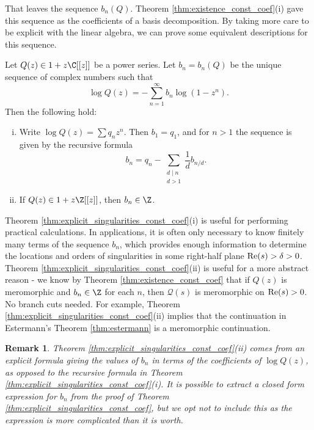 \documentclass[12pt]{amsart}
\newtheorem{remark}[theorem]{Remark}
\theoremstyle{plain}
\begin{document}
That leaves the sequence $b_n(Q)$. Theorem \ref{thm:existence_const_coef}(i) gave this sequence as the coefficients of a basis decomposition. By taking more care to be explicit with the linear algebra, we can prove some equivalent descriptions for this sequence.

\begin{theorem}\label{thm:explicit_singularities_const_coef}
    Let $Q(z)\in 1+z\C[[z]]$ be a power series. Let $b_n = b_n(Q)$ be the unique sequence of complex numbers such that
    \[
        \log Q(z) = -\sum_{n=1}^{\infty} b_n \log(1-z^n).
    \]
    Then the following hold:
    \begin{enumerate}[(i)]
        \item Write $\log Q(z)=\sum q_n z^n$. Then $b_1=q_1$, and for $n>1$ the sequence is given by the recursive formula
        \[
            b_n = q_n - \sum_{\substack{d\mid n\\d>1}}\frac{1}{d}b_{n/d}.
        \]
        \item If $Q(z) \in 1 + z\Z[[z]]$, then $b_n\in \Z$.
    \end{enumerate}
\end{theorem}

Theorem \ref{thm:explicit_singularities_const_coef}(i) is useful for performing practical calculations. In applications, it is often only necessary to know finitely many terms of the sequence $b_n$, which provides enough information to determine the locations and orders of singularities in some right-half plane ${\rm Re}(s) > \delta > 0$. Theorem \ref{thm:explicit_singularities_const_coef}(ii) is useful for a more abstract reason - we know by Theorem \ref{thm:existence_const_coef} that if $Q(z)$ is meromorphic and $b_n\in \Z$ for each $n$, then $\mathcal{Q}(s)$ is meromorphic on ${\rm Re}(s)>0$. No branch cuts needed. For example, Theorem \ref{thm:explicit_singularities_const_coef}(ii) implies that the continuation in Estermann's Theorem \ref{thm:estermann} is a meromorphic continuation.

\begin{remark}
    Theorem \ref{thm:explicit_singularities_const_coef}(ii) comes from an explicit formula giving the values of $b_n$ in terms of the coefficients of $\log Q(z)$, as opposed to the recursive formula in Theorem \ref{thm:explicit_singularities_const_coef}(i). It is possible to extract a closed form expression for $b_n$ from the proof of Theorem \ref{thm:explicit_singularities_const_coef}, but we opt not to include this as the expression is more complicated than it is worth.
\end{remark}
\end{document}
